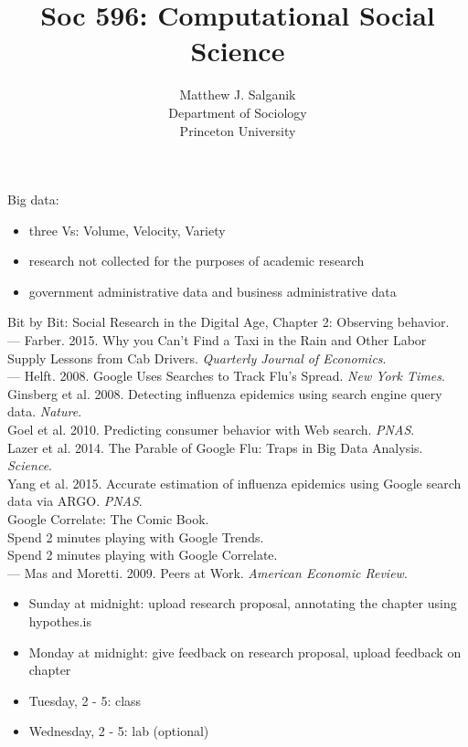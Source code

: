 \documentclass{beamer}
\title[]{Soc 596: Computational Social Science}
\author[]{Matthew J. Salganik\\Department of Sociology\\Princeton University}
\date[]{01-04-Preview for next class (Big Data)
\vfill
\begin{flushright}
\vspace{0.6in}
\texttt{[image: figures/cc.png]}
\end{flushright}
}
\begin{document}
\frame{\titlepage}
\begin{frame}

Big data:\\
\begin{itemize}
\item three Vs: Volume, Velocity, Variety
\item research not collected for the purposes of academic research
\item government administrative data and business administrative data
\end{itemize}

\end{frame}
\begin{frame}

Bit by Bit: Social Research in the Digital Age, Chapter 2: Observing behavior.\\
---
Farber. 2015. Why you Can't Find a Taxi in the Rain and Other Labor Supply Lessons from Cab Drivers. \textit{Quarterly Journal of Economics}.\\
---
Helft. 2008. Google Uses Searches to Track Flu's Spread. \textit{New York Times}.\\
Ginsberg et al. 2008. Detecting influenza epidemics using search engine query data. \textit{Nature}.\\
Goel et al. 2010. Predicting consumer behavior with Web search. \textit{PNAS}.\\
Lazer et al. 2014. The Parable of Google Flu: Traps in Big Data Analysis. \textit{Science}.\\
Yang et al. 2015. Accurate estimation of influenza epidemics using Google search data via ARGO. \textit{PNAS}.\\
Google Correlate: The Comic Book.\\
Spend 2 minutes playing with Google Trends.\\
Spend 2 minutes playing with Google Correlate.\\
---
Mas and Moretti. 2009. Peers at Work. \textit{American Economic Review}.\\
 
\end{frame}
\begin{frame}

\begin{itemize}
\item Sunday at midnight: upload research proposal, annotating the chapter using hypothes.is
\item Monday at midnight: give feedback on research proposal, upload feedback on chapter
\item Tuesday, 2 - 5: class
\item Wednesday, 2 - 5: lab (optional)
\end{itemize}

\end{frame}
\end{document}
